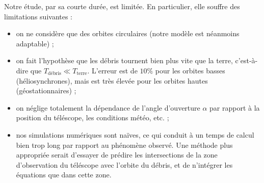 \documentclass[a4paper,11pt]{article}
\numberwithin{section}{part}
\begin{document}
Notre étude, par sa courte durée, est limitée. En particulier, elle
souffre des limitations suivantes :
\begin{itemize}
\item on ne considère que des orbites circulaires (notre
  modèle est néanmoins adaptable) ;
\item on fait l'hypothèse que les débris tournent bien plus vite que
  la terre, c'est-à-dire que $T_{\text{débris}} \ll
  T_{\text{terre}}$. L'erreur est de $10\%$ pour les orbites basses
  (héliosynchrones), mais est très élevée pour les orbites hautes
  (géostationnaires) ;
\item on néglige totalement la dépendance de l'angle d'ouverture
  $\alpha$ par rapport à la position du téléscope, les conditions
  météo, etc. ;
\item nos simulations numériques sont naïves, ce qui conduit à un
  temps de calcul bien trop long par rapport au phénomène observé. Une
  méthode plus appropriée serait d'essayer de prédire les
  intersections de la zone d'observation du téléscope avec l'orbite du
  débris, et de n'intégrer les équations que dans cette zone.
\end{itemize}



\appendix


% 


\begin{thebibliography}{99}
\end{thebibliography}
\end{document}
